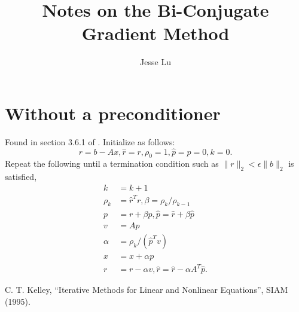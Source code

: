 \documentclass{article}
\title{Notes on the Bi-Conjugate Gradient Method}
\author{Jesse Lu}
\begin{document}
\maketitle
\section{Without a preconditioner}
Found in section 3.6.1 of \cite{kelley}.
Initialize as follows:
\begin{equation}
r = b - Ax, \hat{r} = r, \rho_0 = 1, \hat{p} = p = 0, k = 0.
\end{equation}
Repeat the following until a termination condition 
    such as $\|r\|_2 < \epsilon \|b\|_2$ is satisfied,
    \begin{subequations}\begin{align}
    k &= k + 1 \\
    \rho_k &= \hat{r}^T r, \beta = \rho_k / \rho_{k-1} \\
    p &= r + \beta p, \hat{p} = \hat{r} + \beta \hat{p} \\
    v &= Ap \\
    \alpha &= \rho_k / (\hat{p}^T v) \\
    x &= x + \alpha p \\
    r &= r - \alpha v, \hat{r} = \hat{r} - \alpha A^T \hat{p}.
    \end{align}\end{subequations}


\begin{thebibliography}{99}
 C. T. Kelley, 
    ``Iterative Methods for Linear and Nonlinear Equations'', 
    SIAM (1995).
\end{thebibliography}
\end{document}
